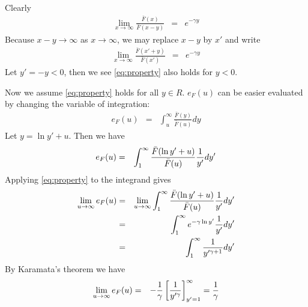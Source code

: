 \documentclass{report}
\begin{document}
\begin{enumerate}[1.]
\begin{enumerate}[(a)]
    Clearly
    \begin{eqnarray*}
      \lim_{x \to \infty} \frac{\bar{F}(x)}{\bar{F}(x - y)} &=&
      e^{-\gamma y}      
    \end{eqnarray*}
    Because $x - y \to \infty$ as $x \to \infty$, we may replace $x -
    y$ by $x'$ and write
    \begin{eqnarray*}
      \lim_{x \to \infty} \frac{\bar{F}(x' + y)}{\bar{F}(x')} &=&
      e^{-\gamma y}      
    \end{eqnarray*}
    Let $y' = -y < 0$, then we see \eqref{eq:property} also holds for
    $y < 0$.

    Now we assume \eqref{eq:property} holds for all $y \in
    R$. $e_F(u)$ can be easier evaluated by changing the variable of
    integration:
    \begin{eqnarray*}
      e_F(u) &=& \int_{u}^{\infty} \frac{\bar{F}(y)}{\bar{F}(u)} dy
    \end{eqnarray*}
    Let $y = \ln y' + u$. Then we have
    \begin{eqnarray*}
      e_F(u) &=& \int_{1}^{\infty} \frac{\bar{F}(\ln y' +
        u)}{\bar{F}(u)}{1 \over y'} dy' \\
    \end{eqnarray*}
    Applying \eqref{eq:property} to the integrand gives
    \begin{eqnarray*}
      \lim_{u \to \infty} e_F(u) &=& \lim_{u \to \infty}
      \int_{1}^{\infty} \frac{\bar{F}(\ln y' + u)}{\bar{F}(u)}{1 \over
        y'} dy' \\
      &=& \int_{1}^{\infty} e^{-\gamma \ln y'}{1 \over
        y'} dy' \\
      &=& \int_{1}^{\infty} {1 \over y'^{\gamma + 1}} dy' \\
    \end{eqnarray*}
    By Karamata's theorem we have
    \begin{eqnarray*}
      \lim_{u \to \infty} e_F(u) &=& - {1 \over \gamma} \left[{1 \over
          y'^\gamma}\right]_{y'=1}^{\infty} = {1 \over \gamma}\\
    \end{eqnarray*}


\end{enumerate}
\end{enumerate}
\end{document}

